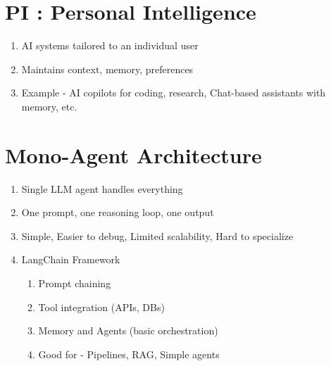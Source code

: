 
\section{PI : Personal Intelligence}
    \begin{enumerate}
        \item AI systems tailored to an individual user
        \item Maintains context, memory, preferences
        \item Example - AI copilots for coding, research, Chat-based assistants with memory, etc.
    \end{enumerate}

\section{Mono-Agent Architecture}
    \begin{enumerate}
        \item Single LLM agent handles everything
        \item One prompt, one reasoning loop, one output
        \item Simple, Easier to debug, Limited scalability, Hard to specialize
        \item LangChain Framework
            \begin{enumerate}
                \item Prompt chaining 
                \item Tool integration (APIs, DBs)
                \item Memory and Agents (basic orchestration)
                \item Good for - Pipelines, RAG, Simple agents
            \end{enumerate}
    \end{enumerate}


